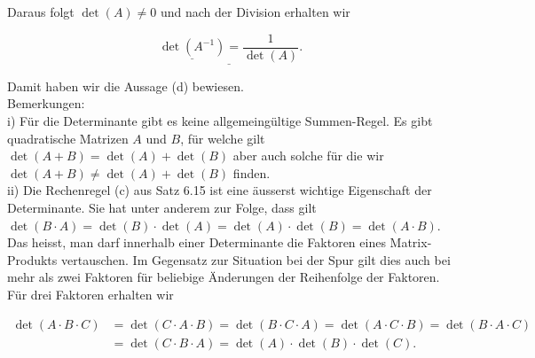 \documentclass[10pt]{article}
\begin{document}
Daraus folgt $\operatorname{det}(A) \neq 0$ und nach der Division erhalten wir


\begin{equation*}
\underline{\underline{\operatorname{det}\left(A^{-1}\right)}=\frac{1}{\operatorname{det}(A)}} . \tag{6.120}
\end{equation*}


Damit haben wir die Aussage (d) bewiesen.\\
Bemerkungen:\\
i) Für die Determinante gibt es keine allgemeingültige Summen-Regel. Es gibt quadratische Matrizen $A$ und $B$, für welche gilt $\operatorname{det}(A+B)=\operatorname{det}(A)+\operatorname{det}(B)$ aber auch solche für die wir $\operatorname{det}(A+B) \neq \operatorname{det}(A)+\operatorname{det}(B)$ finden.\\
ii) Die Rechenregel (c) aus Satz 6.15 ist eine äusserst wichtige Eigenschaft der Determinante. Sie hat unter anderem zur Folge, dass gilt\\
$\operatorname{det}(B \cdot A)=\operatorname{det}(B) \cdot \operatorname{det}(A)=\operatorname{det}(A) \cdot \operatorname{det}(B)=\operatorname{det}(A \cdot B)$.\\
Das heisst, man darf innerhalb einer Determinante die Faktoren eines Matrix-Produkts vertauschen. Im Gegensatz zur Situation bei der Spur gilt dies auch bei mehr als zwei Faktoren für beliebige Änderungen der Reihenfolge der Faktoren. Für drei Faktoren erhalten wir


\begin{align*}
\operatorname{det}(A \cdot B \cdot C) & =\operatorname{det}(C \cdot A \cdot B)=\operatorname{det}(B \cdot C \cdot A)=\operatorname{det}(A \cdot C \cdot B)=\operatorname{det}(B \cdot A \cdot C) \\
& =\operatorname{det}(C \cdot B \cdot A)=\operatorname{det}(A) \cdot \operatorname{det}(B) \cdot \operatorname{det}(C) . \tag{6.122}
\end{align*}
\end{document}
